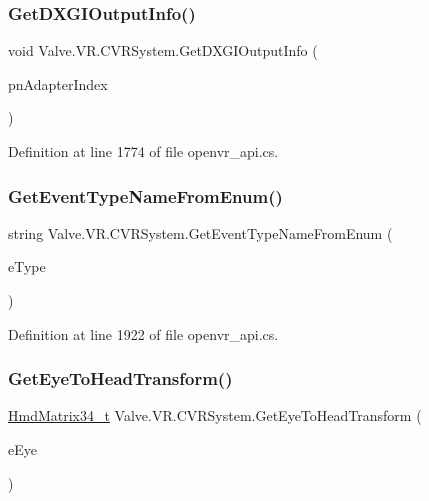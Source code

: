 \mbox{\label{class_valve_1_1_v_r_1_1_c_v_r_system_a04a43b098747d72d59534db48ce7c293}} 
\subsubsection{\texorpdfstring{GetDXGIOutputInfo()}{GetDXGIOutputInfo()}}
{\footnotesize\ttfamily void Valve.\+V\+R.\+C\+V\+R\+System.\+Get\+D\+X\+G\+I\+Output\+Info (\begin{DoxyParamCaption}\item[{ref int}]{pn\+Adapter\+Index }\end{DoxyParamCaption})}



Definition at line 1774 of file openvr\+\_\+api.\+cs.

\mbox{\label{class_valve_1_1_v_r_1_1_c_v_r_system_af1e8543cb021f7215c6252db5c0b5e3d}} 
\subsubsection{\texorpdfstring{GetEventTypeNameFromEnum()}{GetEventTypeNameFromEnum()}}
{\footnotesize\ttfamily string Valve.\+V\+R.\+C\+V\+R\+System.\+Get\+Event\+Type\+Name\+From\+Enum (\begin{DoxyParamCaption}\item[{\mbox{\hyperlink{namespace_valve_1_1_v_r_afe3398b9e5cb1ea06335142d1b9289f3}{E\+V\+R\+Event\+Type}}}]{e\+Type }\end{DoxyParamCaption})}



Definition at line 1922 of file openvr\+\_\+api.\+cs.

\mbox{\label{class_valve_1_1_v_r_1_1_c_v_r_system_a71db4b263545bd87e2972eef7a27dca3}} 
\subsubsection{\texorpdfstring{GetEyeToHeadTransform()}{GetEyeToHeadTransform()}}
{\footnotesize\ttfamily \mbox{\hyperlink{struct_valve_1_1_v_r_1_1_hmd_matrix34__t}{Hmd\+Matrix34\+\_\+t}} Valve.\+V\+R.\+C\+V\+R\+System.\+Get\+Eye\+To\+Head\+Transform (\begin{DoxyParamCaption}\item[{\mbox{\hyperlink{namespace_valve_1_1_v_r_a8153d4a3e627e1cede046327087c1880}{E\+V\+R\+Eye}}}]{e\+Eye }\end{DoxyParamCaption})}



